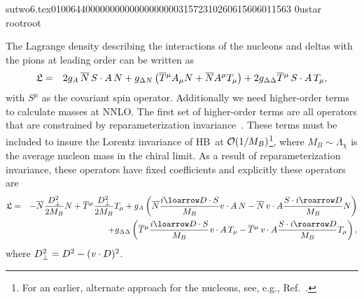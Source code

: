                                                                                                                                                                                                                                                                                       sutwo6.tex                                                                                          0100644 0000000 0000000 00000315723 10260615606 011563  0                                                                                                    ustar   root                            root                                                                                                                                                                                                                   \documentclass[prd,amssymb,amsmath,showpacs,nofootinbib,superscriptaddress]{revtex4}
\begin{document}
The Lagrange density describing the interactions of the nucleons and deltas
with the pions at leading order can be written as
\begin{eqnarray}
\mathfrak{L} 
&=&
2 g_A \, {\overline{N}} \, S \cdot A \, N 
+ g_{{\Delta} N} \left( {\overline{T}} {}^\mu A_\mu N + {\overline{N}} A^\mu T_\mu \right)
+ 2 g_{{\Delta} {\Delta}} {\overline{T}} {}^\mu \, S \cdot A \, T_\mu
\label{eq:MBT},\end{eqnarray}
with $S^\mu$ as the covariant spin operator. 
Additionally we need higher-order terms to calculate masses at NNLO. 
The first set of higher-order terms are all operators that are constrained
by reparameterization 
invariance~\cite{Luke:1992cs,Manohar:2000dt}. 
These terms must be included to insure the Lorentz invariance of HB\CPT\ 
at ${\mathcal O}(1/M_B)$\footnote{For an earlier, alternate approach for the nucleons, see, e.g., Ref.~\cite{Bernard:1992qa}.}, 
where $M_B \sim \Lambda_\chi$ is the average nucleon mass in the chiral limit. 
As a result of reparameterization invariance, these operators have fixed coefficients
and explicitly these operators are
\begin{eqnarray}
\mathfrak{L} 
&=& 
- \ol N  \frac{D_\perp^2}{2 M_B} N 
+ \Tbar {}^\mu \frac{D_\perp^2}{2 M_B} T_\mu 
+ g_A 
\left( 
\ol N \frac{i \loarrow D \cdot S}{M_B} v \cdot A \, N 
- 
\ol N \, v \cdot A \frac{ S \cdot i \roarrow D }{M_B} N
\right)
\notag \\
&&+ 
g_{\D \D} \left( \Tbar {}^\mu \frac{i \loarrow D \cdot S}{M_B}
       \vit \cdot A \, T_\mu - \Tbar {}^\mu \, \vit\cdot A \frac{S\cdot i \roarrow D}
       {M_B} T_\mu \right)
\label{eq:fixed}
,\end{eqnarray}
where $D_\perp^2 = D^2 - ({\it v} \cdot D)^2$.
\end{document}
